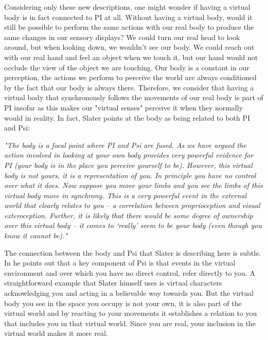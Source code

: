 Considering only these new descriptions, one might wonder if having a virtual body is in fact connected to PI at all. Without having a virtual body, would it still be possible to perform the same actions with our real body to produce the same changes in our sensory displays? We could turn our real head to look around, but when looking down, we wouldn't see our body. We could reach out with our real hand and feel an object when we touch it, but our hand would not occlude the view of the object we are touching. Our body is a constant in our perception, the actions we perform to perceive the world are always conditioned by the fact that our body is always there. Therefore, we consider that having a virtual body that synchronously follows the movements of our real body is part of PI insofar as this makes our "virtual senses" perceive it when they normally would in reality. In fact, Slater points at the body as being related to both PI and Psi:

\begin{displayquote}
\textit{"The body is a focal point where PI and Psi are fused. As we have argued the action involved in looking at your own body provides very powerful evidence for PI (your body is in the place you perceive yourself to be). However, this virtual body is not yours, it is a representation of you. In principle you have no control over what it does. Now suppose you move your limbs and you see the limbs of this virtual body move in synchrony. This is a very powerful event in the external world that clearly relates to you – a correlation between proprioception and visual exteroception. Further, it is likely that there would be some degree of ownership over this virtual body – it comes to ‘really’ seem to be your body (even though you know it cannot be)."} \parencite{Slater2009}
\end{displayquote}

The connection between the body and Psi that Slater is describing here is subtle. In \parencite{Slater2009} he points out that a key component of Psi is that events in the virtual environment and over which you have no direct control, refer directly to you. A straightforward example that Slater himself uses is virtual characters acknowledging you and acting in a believable way towards you. But the virtual body you see in the space you occupy is not your own, it is also part of the virtual world and by reacting to your movements it establishes a relation to you that includes you in that virtual world. Since you are real, your inclusion in the virtual world makes it more real.

